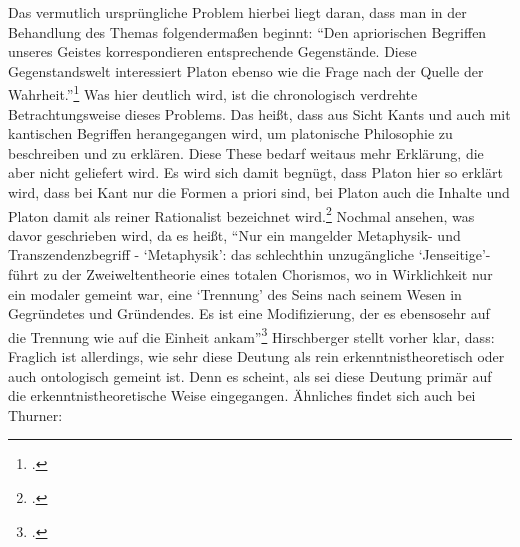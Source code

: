 Das vermutlich ursprüngliche Problem hierbei liegt daran, dass man in der Behandlung des Themas folgendermaßen beginnt: \enquote{Den apriorischen Begriffen unseres Geistes korrespondieren entsprechende Gegenstände. Diese Gegenstandswelt interessiert Platon ebenso wie die Frage nach der Quelle der Wahrheit.}\footcite[][S. 97]{Hirschberger}
Was hier deutlich wird, ist die chronologisch verdrehte Betrachtungsweise dieses Problems. Das heißt, dass aus Sicht Kants und auch mit kantischen Begriffen herangegangen wird, um platonische Philosophie zu beschreiben und zu erklären. Diese These bedarf weitaus mehr Erklärung, die aber nicht geliefert wird. Es wird sich damit begnügt, dass Platon hier so erklärt wird, dass bei Kant nur die Formen a priori sind, bei Platon auch die Inhalte und Platon damit als reiner Rationalist bezeichnet wird.\footcite[vgl.][S.96]{Hirschberger} 
Nochmal ansehen, was davor geschrieben wird, da es heißt, \enquote{Nur ein mangelder Metaphysik- und Transzendenzbegriff - \enquote{Metaphysik}: das schlechthin unzugängliche \enquote{Jenseitige}- führt zu der Zweiweltentheorie eines totalen Chorismos, wo in Wirklichkeit nur ein modaler gemeint war, eine \enquote{Trennung} des Seins nach seinem Wesen in Gegründetes und Gründendes. Es ist eine Modifizierung, der es ebensosehr auf die Trennung wie auf die Einheit ankam}\footcite[][S. 96]{Hirschberger}
Hirschberger stellt vorher klar, dass:
Fraglich ist allerdings, wie sehr diese Deutung als rein erkenntnistheoretisch oder auch ontologisch gemeint ist. Denn es scheint, als sei diese Deutung primär auf die erkenntnistheoretische Weise eingegangen.
Ähnliches findet sich auch bei Thurner: